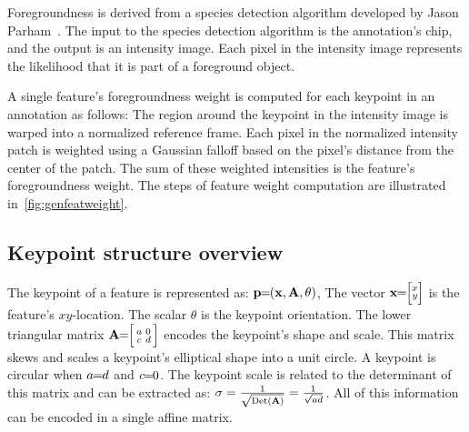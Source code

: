         Foregroundness is derived from a species detection algorithm developed by Jason
        Parham~\cite{parham_photographic_2015}. The input to the species detection algorithm is the annotation's
        chip, and the output is an intensity image. Each pixel in the intensity image represents the likelihood
        that it is part of a foreground object.

        A single feature's foregroundness weight is computed for each keypoint in an annotation as follows: The
        region around the keypoint in the intensity image is warped into a normalized reference frame. Each pixel
        in the normalized intensity patch is weighted using a Gaussian falloff based on the pixel's distance from
        the center of the patch. The sum of these weighted intensities is the feature's foregroundness weight. The
        steps of feature weight computation are illustrated in~\cref{fig:genfeatweight}.

        \SceneryMatch{}

        \genfeatweight{}

    \subsection{Keypoint structure overview}\label{sec:kpstructure}
        The keypoint of a feature is represented as: $\mathbf{p}\mkern-6mu=\mkern-6mu(\mathbf{x}, \mathbf{A}, \theta)$, %
        The vector $\mathbf{x}\mkern-6mu=\mkern-6mu \Bigl[\negthinspace \begin{smallmatrix}  x\\ y \end{smallmatrix} \negthinspace \Bigr] $ is the feature's $xy$-location. The scalar $\theta$ is the keypoint
        orientation. The lower triangular matrix $\mathbf{A}\mkern-6mu=\mkern-6mu \Bigl[ \begin{smallmatrix} a & 0\\c & d \end{smallmatrix} \Bigr] $ encodes the keypoint's shape and scale.
        This matrix skews and scales a keypoint's elliptical shape into a unit circle. A keypoint is circular when
        $a\mkern-6mu=\mkern-6mu{}d$ and $c\mkern-6mu=\mkern-6mu0$.
        The keypoint scale is related to the determinant of this matrix and can be extracted as: %
        $\sigma = \frac{1}{\sqrt{\mathbin{\textrm{Det}}\left(\mathbf{A}\right)}} = \frac{1}{\sqrt{ad}}$. All of this information can be encoded in
        a single affine matrix.

